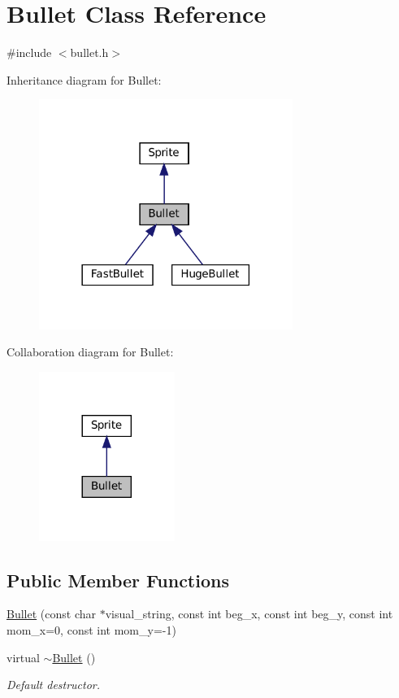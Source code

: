 \hypertarget{classBullet}{}\section{Bullet Class Reference}
\label{classBullet}


{\ttfamily \#include $<$bullet.\+h$>$}



Inheritance diagram for Bullet\+:\nopagebreak
\begin{figure}[H]
\begin{center}
\leavevmode
\includegraphics[width=234pt]{classBullet__inherit__graph}
\end{center}
\end{figure}


Collaboration diagram for Bullet\+:\nopagebreak
\begin{figure}[H]
\begin{center}
\leavevmode
\includegraphics[width=125pt]{classBullet__coll__graph}
\end{center}
\end{figure}
\subsection*{Public Member Functions}
\begin{DoxyCompactItemize}
\item 
\hyperlink{classBullet_ae3b4624da4a6bc8e1fdc595cd5d1514a}{Bullet} (const char $\ast$visual\+\_\+string, const int beg\+\_\+x, const int beg\+\_\+y, const int mom\+\_\+x=0, const int mom\+\_\+y=-\/1)
\item 
virtual \hyperlink{classBullet_aaeb5cb41d7db89f49007b08b41f1bfcf}{$\sim$\+Bullet} ()
\begin{DoxyCompactList}\small\item\em Default destructor. \end{DoxyCompactList}\end{DoxyCompactItemize}
